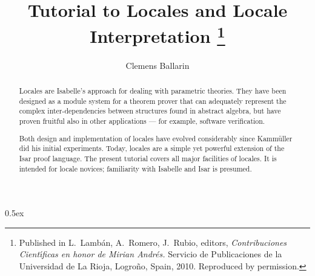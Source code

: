 \documentclass[11pt,a4paper]{article}
\begin{document}
\title{Tutorial to Locales and Locale Interpretation%
\thanks{Published in L.~Lamb\'an, A.~Romero, J.~Rubio, editors, {\em Contribuciones Cient\'{\i}ficas en honor de Mirian Andr\'es.}  Servicio de Publicaciones de la Universidad de La Rioja, Logro\~no, Spain, 2010.  Reproduced by permission.}}
\author{Clemens Ballarin}
\date{}

\maketitle

\begin{abstract}
  Locales are Isabelle's approach for dealing with parametric
  theories.  They have been designed as a module system for a
  theorem prover that can adequately represent the complex
  inter-dependencies between structures found in abstract algebra, but
  have proven fruitful also in other applications --- for example,
  software verification.

  Both design and implementation of locales have evolved considerably
  since Kamm\"uller did his initial experiments.  Today, locales
  are a simple yet powerful extension of the Isar proof language.
  The present tutorial covers all major facilities of locales.  It is
  intended for locale novices; familiarity with Isabelle and Isar is
  presumed.
\end{abstract}

\parindent 0pt\parskip 0.5ex



\newpage


\end{document}

